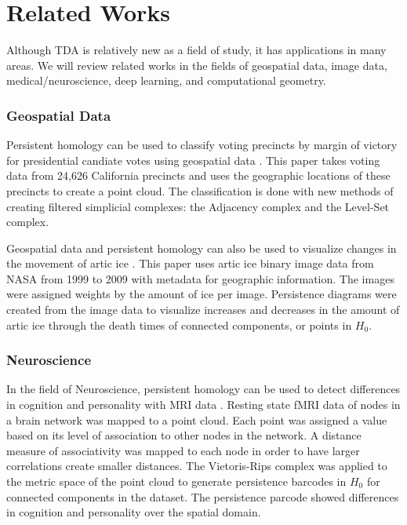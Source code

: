 \documentclass[ma]{uncgdissertationexp}
\theoremstyle{plain}
\theoremstyle{definition}
\theoremstyle{remark}
\begin{document}
\section{Related Works}
\par Although TDA is relatively new as a field of study, it has applications in many areas. We will review related works in the fields of geospatial data, image data, medical/neuroscience, deep learning, and computational geometry.
\subsubsection{Geospatial Data}
\par Persistent homology can be used to classify voting precincts by margin of victory for presidential candiate votes using geospatial data \cite{geospatial_voting}. This paper takes voting data from 24,626 California precincts and uses the geographic locations of these precincts to create a point cloud. The classification is done with new methods of creating filtered simplicial complexes: the Adjacency complex and the Level-Set complex.
\par Geospatial data and persistent homology can also be used to visualize changes in the movement of artic ice \cite{jocelyn_thesis}. This paper uses artic ice binary image data from NASA from 1999 to 2009 with metadata for geographic information. The images were assigned weights by the amount of ice per image. Persistence diagrams were created from the image data to visualize increases and decreases in the amount of artic ice through the death times of connected components, or points in $H_{0}$.
\subsubsection{Neuroscience}
\par In the field of Neuroscience, persistent homology can be used to detect differences in cognition and personality with MRI data \cite{TDA_MRI}. Resting state fMRI data of nodes in a brain network was mapped to a point cloud. Each point was assigned a value based on its level of association to other nodes in the network. A distance measure of associativity was mapped to each node in order to have larger correlations create smaller distances. The Vietoris-Rips complex was applied to the metric space of the point cloud to generate persistence barcodes in $H_{0}$ for connected components in the dataset. The persistence parcode showed differences in cognition and personality over the spatial domain.
\end{document}
